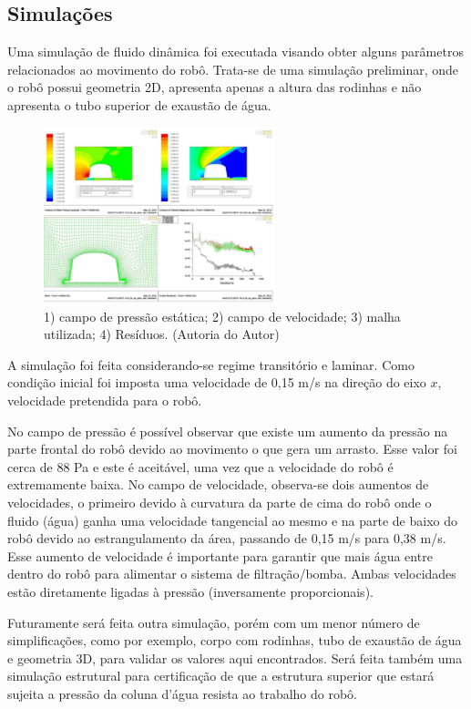 \subsection{Simulações}
Uma simulação de fluido dinâmica foi executada visando obter alguns parâmetros relacionados ao movimento do robô. Trata-se de uma simulação preliminar, onde o robô possui geometria 2D, apresenta apenas a altura das rodinhas e não apresenta o tubo superior de exaustão de água.
\par
\begin{figure}[h]
  \centering
  \includegraphics[width=0.6\textwidth]{figures/simulation.png}
  \caption{1) campo de pressão estática; 2) campo de velocidade; 3) malha utilizada; 4) Resíduos. (\textsf{Autoria do Autor})}
  \label{fig:simulation}
\end{figure}
\FloatBarrier
\par
A simulação foi feita considerando-se regime transitório e laminar. Como condição inicial foi imposta uma velocidade de 0,15 m/s na direção do eixo $x$, velocidade pretendida para o robô.

No campo de pressão é possível observar que existe um aumento da pressão na parte frontal do robô devido ao movimento o que gera um arrasto. Esse valor foi cerca de 88 Pa e este é aceitável, uma vez que a velocidade do robô é extremamente baixa. No campo de velocidade, observa-se dois aumentos de velocidades, o primeiro devido à curvatura da parte de cima do robô onde o fluido (água) ganha uma velocidade tangencial ao mesmo e na parte de baixo do robô devido ao estrangulamento da área, passando de 0,15 m/s para 0,38 m/s. Esse aumento de velocidade é importante para garantir que mais água entre dentro do robô para alimentar o sistema de filtração/bomba. Ambas velocidades estão diretamente ligadas à pressão (inversamente proporcionais).

Futuramente será feita outra simulação, porém com um menor número de simplificações, como por exemplo, corpo com rodinhas, tubo de exaustão de água e geometria 3D, para validar os valores aqui encontrados. Será feita também uma simulação estrutural para certificação de que a estrutura superior que estará sujeita a pressão da coluna d’água resista ao trabalho do robô.